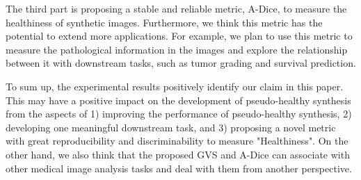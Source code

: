\documentclass[journal,twoside,web]{ieeecolor}
\begin{document}
The third part is proposing a stable and reliable metric, A-Dice, to measure the healthiness of synthetic images. Furthermore, we think this metric has the potential to extend more applications. For example, we plan to use this metric to measure the pathological information in the images and explore the relationship between it with downstream tasks, such as tumor grading and survival prediction.

To sum up, the experimental results positively identify our claim in this paper. This may have a positive impact on the development of pseudo-healthy synthesis from the aspects of 1) improving the performance of pseudo-healthy synthesis, 2) developing one meaningful downstream task, and 3) proposing a novel metric with great reproducibility and discriminability to measure "Healthiness". On the other hand, we also think that the proposed GVS and A-Dice can associate with other medical image analysis tasks and deal with them from another perspective.



\end{document}
